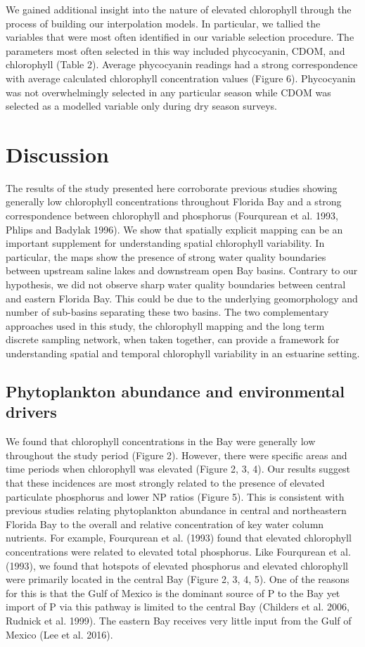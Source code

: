 We gained additional insight into the nature of elevated chlorophyll through the process of building our interpolation models. In particular, we tallied the variables that were most often identified in our variable selection procedure. The parameters most often selected in this way included phycocyanin, CDOM, and chlorophyll (Table 2). Average phycocyanin readings had a strong correspondence with average calculated chlorophyll concentration values (Figure 6). Phycocyanin was not overwhelmingly selected in any particular season while CDOM was selected as a modelled variable only during dry season surveys.

\section{Discussion}
\label{discussion}

The results of the study presented here corroborate previous studies showing generally low chlorophyll concentrations throughout Florida Bay and a strong correspondence between chlorophyll and phosphorus (Fourqurean et al. 1993, Phlips and Badylak 1996). We show that spatially explicit mapping can be an important supplement for understanding spatial chlorophyll variability. In particular, the maps show the presence of strong water quality boundaries between upstream saline lakes and downstream open Bay basins. Contrary to our hypothesis, we did not observe sharp water quality boundaries between central and eastern Florida Bay. This could be due to the underlying geomorphology and number of sub-basins separating these two basins. The two complementary approaches used in this study, the chlorophyll mapping and the long term discrete sampling network, when taken together, can provide a framework for understanding spatial and temporal chlorophyll variability in an estuarine setting. 

\subsection{Phytoplankton abundance and environmental drivers}
\label{phytoabund}

We found that chlorophyll concentrations in the Bay were generally low throughout the study period (Figure 2). However, there were specific areas and time periods when chlorophyll was elevated (Figure 2, 3, 4). Our results suggest that these incidences are most strongly related to the presence of elevated particulate phosphorus and lower NP ratios (Figure 5). This is consistent with previous studies relating phytoplankton abundance in central and northeastern Florida Bay to the overall and relative concentration of key water column nutrients. For example, Fourqurean et al. (1993) found that elevated chlorophyll concentrations were related to elevated total phosphorus. Like Fourqurean et al. (1993), we found that hotspots of elevated phosphorus and elevated chlorophyll were primarily located in the central Bay (Figure 2, 3, 4, 5). One of the reasons for this is that the Gulf of Mexico is the dominant source of P to the Bay yet import of P via this pathway is limited to the central Bay (Childers et al. 2006, Rudnick et al. 1999). The eastern Bay receives very little input from the Gulf of Mexico (Lee et al. 2016). 

